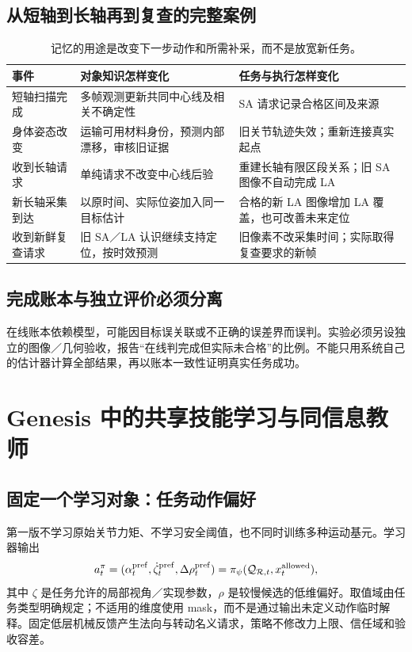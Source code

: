 \documentclass[UTF8,11pt,a4paper,fontset=fandol]{ctexart}
\numberwithin{equation}{section}
\theoremstyle{definition}
\begin{document}
\subsection{从短轴到长轴再到复查的完整案例}
\begin{table}[htbp]\centering\small
\begin{tabularx}{\linewidth}{P{22mm}YY}
\toprule
事件 & 对象知识怎样变化 & 任务与执行怎样变化\\\midrule
短轴扫描完成 & 多帧观测更新共同中心线及相关不确定性 & SA 请求记录合格区间及来源\\
身体姿态改变 & 运输可用材料身份，预测内部漂移，审核旧证据 & 旧关节轨迹失效；重新连接真实起点\\
收到长轴请求 & 单纯请求不改变中心线后验 & 重建长轴有限区段关系；旧 SA 图像不自动完成 LA\\
新长轴采集到达 & 以原时间、实际位姿加入同一目标估计 & 合格的新 LA 图像增加 LA 覆盖，也可改善未来定位\\
收到新鲜复查请求 & 旧 SA／LA 认识继续支持定位，按时效预测 & 旧像素不改采集时间；实际取得复查要求的新帧\\\bottomrule
\end{tabularx}
\caption{记忆的用途是改变下一步动作和所需补采，而不是放宽新任务。}
\end{table}

\subsection{完成账本与独立评价必须分离}
在线账本依赖模型，可能因目标误关联或不正确的误差界而误判。实验必须另设独立的图像／几何验收，报告“在线判完成但实际未合格”的比例。不能只用系统自己的估计器计算全部结果，再以账本一致性证明真实任务成功。

\section{Genesis 中的共享技能学习与同信息教师}
\label{sec:learning}
\subsection{固定一个学习对象：任务动作偏好}
第一版不学习原始关节力矩、不学习安全阈值，也不同时训练多种运动基元。学习器输出
\begin{equation}
a_t^\pi=(\alpha_t^{\rm pref},\dot\zeta_t^{\rm pref},\Delta\rho_t^{\rm pref})
=\pi_\psi(\mathcal Q_{\mathcal R,t},x_t^{\rm allowed}),
\label{eq:policy}
\end{equation}
其中 $\zeta$ 是任务允许的局部视角／实现参数，$\rho$ 是较慢候选的低维偏好。取值域由任务类型明确规定；不适用的维度使用 mask，而不是通过输出未定义动作临时解释。固定低层机械反馈产生法向与转动名义请求，策略不修改力上限、信任域和验收容差。
\end{document}
